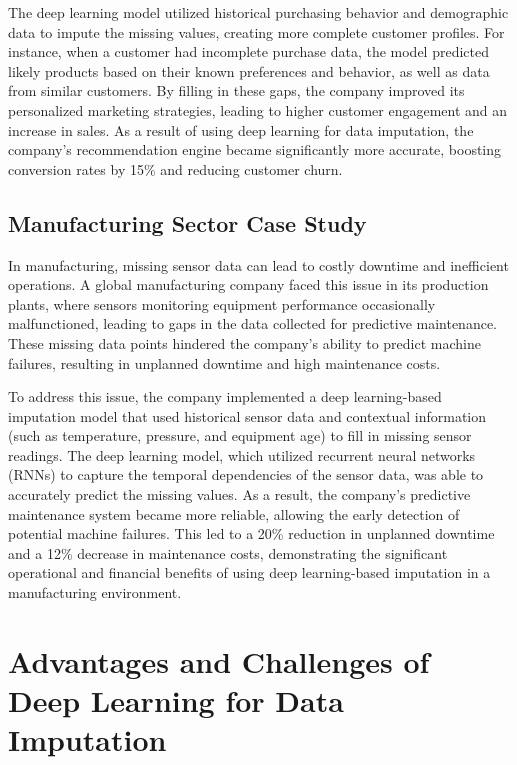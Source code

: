 \documentclass{article}
\begin{document}
The deep learning model utilized historical purchasing behavior and demographic data to impute the missing values, creating more complete customer profiles. For instance, when a customer had incomplete purchase data, the model predicted likely products based on their known preferences and behavior, as well as data from similar customers. By filling in these gaps, the company improved its personalized marketing strategies, leading to higher customer engagement and an increase in sales. As a result of using deep learning for data imputation, the company’s recommendation engine became significantly more accurate, boosting conversion rates by 15\% and reducing customer churn.

\subsection{Manufacturing Sector Case Study}
In manufacturing, missing sensor data can lead to costly downtime and inefficient operations. A global manufacturing company faced this issue in its production plants, where sensors monitoring equipment performance occasionally malfunctioned, leading to gaps in the data collected for predictive maintenance. These missing data points hindered the company’s ability to predict machine failures, resulting in unplanned downtime and high maintenance costs.

To address this issue, the company implemented a deep learning-based imputation model that used historical sensor data and contextual information (such as temperature, pressure, and equipment age) to fill in missing sensor readings. The deep learning model, which utilized recurrent neural networks (RNNs) to capture the temporal dependencies of the sensor data, was able to accurately predict the missing values. As a result, the company’s predictive maintenance system became more reliable, allowing the early detection of potential machine failures. This led to a 20\% reduction in unplanned downtime and a 12\% decrease in maintenance costs, demonstrating the significant operational and financial benefits of using deep learning-based imputation in a manufacturing environment.
\pagebreak
\section{Advantages and Challenges of Deep Learning for Data Imputation}
\end{document}
